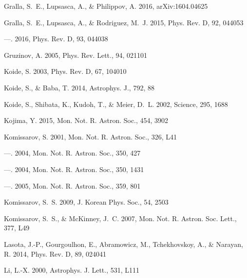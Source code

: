 \documentclass[iop,apj]{emulateapj}
\begin{document}
\begin{thebibliography}{}
Gralla, S.~E., Lupsasca, A., \& Philippov, A. 2016{},
  arXiv:1604.04625

Gralla, S.~E., Lupsasca, A., \& Rodriguez, M.~J. 2015, Phys. Rev. D, 92, 044053

---. 2016{}, Phys. Rev. D, 93, 044038

Gruzinov, A. 2005, Phys. Rev. Lett., 94, 021101

Koide, S. 2003, Phys. Rev. D, 67, 104010

Koide, S., \& Baba, T. 2014, Astrophys. J., 792, 88

Koide, S., Shibata, K., Kudoh, T., \& Meier, D.~L. 2002, Science, 295, 1688

Kojima, Y. 2015, Mon. Not. R. Astron. Soc., 454, 3902

Komissarov, S. 2001, Mon. Not. R. Astron. Soc., 326, L41

---. 2004{}, Mon. Not. R. Astron. Soc., 350, 427

---. 2004{}, Mon. Not. R. Astron. Soc., 350, 1431

---. 2005, Mon. Not. R. Astron. Soc., 359, 801

Komissarov, S.~S. 2009, J. Korean Phys. Soc., 54, 2503

Komissarov, S.~S., \& McKinney, J.~C. 2007, Mon. Not. R. Astron. Soc. Lett.,
  377, L49

Lasota, J.-P., Gourgoulhon, E., Abramowicz, M., Tchekhovskoy, A., \& Narayan,
  R. 2014, Phys. Rev. D, 89, 024041

Li, L.-X. 2000, Astrophys. J. Lett., 531, L111


\end{thebibliography}
\end{document}
